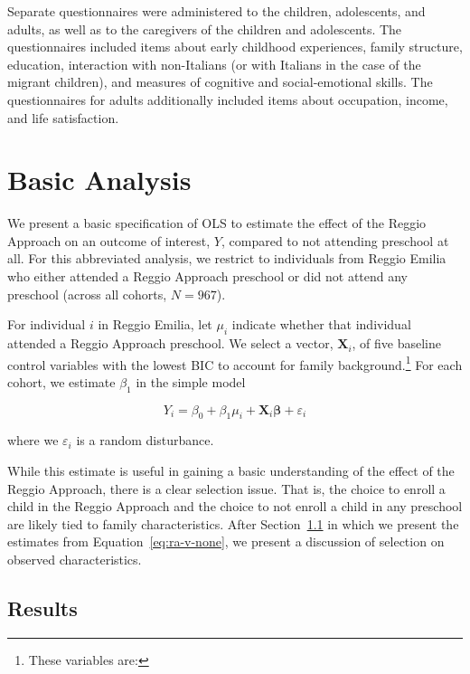 Separate questionnaires were administered to the children, adolescents, and adults, as well as to the caregivers of the children and adolescents. The questionnaires included items about early childhood experiences, family structure, education, interaction with non-Italians (or with Italians in the case of the migrant children), and measures of cognitive and social-emotional skills. The questionnaires for adults additionally included items about occupation, income, and life satisfaction. 

\section{Basic Analysis}
\label{sec:methodology}

We present a basic specification of OLS to estimate the effect of the Reggio Approach on an outcome of interest, $Y$, compared to not attending preschool at all. For this abbreviated analysis, we restrict to individuals from Reggio Emilia who either attended a Reggio Approach preschool or did not attend any preschool (across all cohorts, $N = 967$).

For individual $i$ in Reggio Emilia, let $\mu_i$ indicate whether that individual attended a Reggio Approach preschool. We select a vector, $\bm{X}_i$, of five baseline control variables with the lowest BIC to account for family background.\footnote{These variables are: \color{maroon}{forthcoming}} For each cohort, we estimate $\beta_1$ in the simple model

\begin{equation}
	Y_i = \beta_0 + \beta_1 \mu_i + \bm{X}_i\bm{\beta} + \varepsilon_i
	\label{eq:ra-v-none}
\end{equation}

\noindent where we $\varepsilon_i$ is a random disturbance. 

While this estimate is useful in gaining a basic understanding of the effect of the Reggio Approach, there is a clear selection issue. That is, the choice to enroll a child in the Reggio Approach and the choice to not enroll a child in any preschool are likely tied to family characteristics. After Section~\ref{sec:results} in which we present the estimates from Equation~\eqref{eq:ra-v-none}, we present a discussion of selection on observed characteristics.

\subsection{Results}
\label{sec:results}

